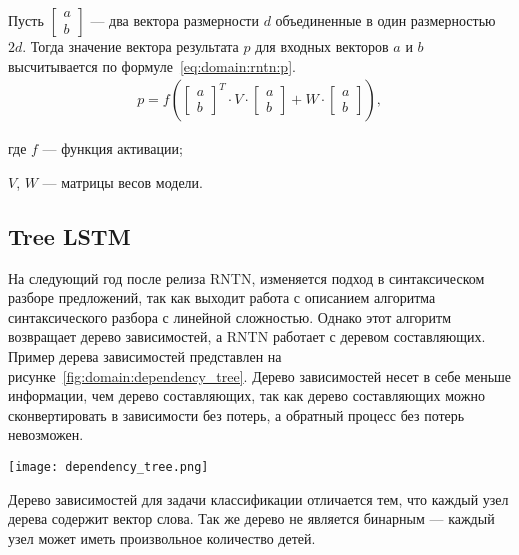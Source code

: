 Пусть $\begin{bmatrix}a\\b\end{bmatrix}$ --- два вектора размерности $d$ объединенные в один размерностью $2d$. Тогда значение вектора результата $p$ для входных векторов $a$ и $b$ высчитывается по формуле~\ref{eq:domain:rntn:p}\cite{RNTN}.
\begin{gather}
  \label{eq:domain:rntn:p}
  p = f(
  \begin{bmatrix}
    a\\
    b
  \end{bmatrix}^{T}\cdot{V}\cdot{
  \begin{bmatrix}
    a\\
    b
  \end{bmatrix}} + W\cdot{
  \begin{bmatrix}
    a\\
    b
  \end{bmatrix}}),
\end{gather}
\begin{explanationx}
\item [где] $f$ --- функция активации;
\item $V$, $W$ --- матрицы весов модели.
\end{explanationx}

\subsection{Tree LSTM}
На следующий год после релиза RNTN, изменяется подход в синтаксическом разборе предложений, так как выходит работа с описанием алгоритма синтаксического разбора с линейной сложностью. Однако этот алгоритм возвращает дерево зависимостей, а RNTN работает с деревом составляющих. Пример дерева зависимостей представлен на рисунке~\ref{fig:domain:dependency_tree}. Дерево зависимостей несет в себе меньше информации, чем дерево составляющих, так как дерево составляющих можно сконвертировать в зависимости без потерь, а обратный процесс без потерь невозможен\cite{Chomsky}.

\begin{center}
  \texttt{[image: dependency\_tree.png]}
  \label{fig:domain:dependency_tree}
\end{center}

Дерево зависимостей для задачи классификации отличается тем, что каждый узел дерева содержит вектор слова. Так же дерево не является бинарным --- каждый узел может иметь произвольное количество детей.

